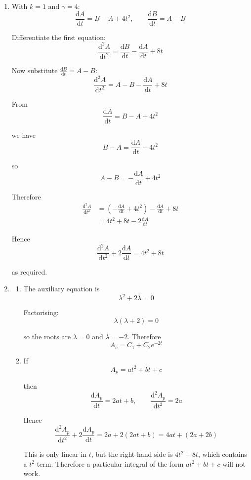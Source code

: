 \documentclass[leqno]{article}
\begin{document}
\begin{enumerate}[
  label=\textbf{\arabic*.},
  leftmargin=*,
  topsep=0pt,
  partopsep=0pt,
  parsep=0pt
]
\begin{djsSolution}
\begin{enumerate}[label=\textbf{(\alph*)}]
  \item With \(k=1\) and \(\gamma=4\):
  \[
  \frac{\mathrm{d}A}{\mathrm{d}t}=B-A+4t^2,
  \qquad
  \frac{\mathrm{d}B}{\mathrm{d}t}=A-B
  \]

  Differentiate the first equation:
  \[
  \frac{\mathrm{d}^2A}{\mathrm{d}t^2}=\frac{\mathrm{d}B}{\mathrm{d}t}-\frac{\mathrm{d}A}{\mathrm{d}t}+8t
  \]

  Now substitute \(\frac{\mathrm{d}B}{\mathrm{d}t}=A-B\):
  \[
  \frac{\mathrm{d}^2A}{\mathrm{d}t^2}=A-B-\frac{\mathrm{d}A}{\mathrm{d}t}+8t
  \]

  From
  \[
  \frac{\mathrm{d}A}{\mathrm{d}t}=B-A+4t^2
  \]

  we have
  \[
  B-A=\frac{\mathrm{d}A}{\mathrm{d}t}-4t^2
  \]

  so
  \[
  A-B=-\frac{\mathrm{d}A}{\mathrm{d}t}+4t^2
  \]

  Therefore
  \begin{align*}
  \frac{\mathrm{d}^2A}{\mathrm{d}t^2}
  &=\left(-\frac{\mathrm{d}A}{\mathrm{d}t}+4t^2\right)-\frac{\mathrm{d}A}{\mathrm{d}t}+8t \\
  &=4t^2+8t-2\frac{\mathrm{d}A}{\mathrm{d}t}
  \end{align*}

  Hence
  \[
  \frac{\mathrm{d}^2A}{\mathrm{d}t^2}+2\frac{\mathrm{d}A}{\mathrm{d}t}=4t^2+8t
  \]

  as required.

  \item
  \begin{enumerate}[label=(\roman*)]
    \item The auxiliary equation is
    \[
    \lambda^2+2\lambda=0
    \]

    Factorising:
    \[
    \lambda(\lambda+2)=0
    \]

    so the roots are \(\lambda=0\) and \(\lambda=-2\). Therefore
    \[
    A_c=C_1+C_2e^{-2t}
    \]

    \item If
    \[
    A_p=at^2+bt+c
    \]

    then
    \[
    \frac{\mathrm{d}A_p}{\mathrm{d}t}=2at+b,
    \qquad
    \frac{\mathrm{d}^2A_p}{\mathrm{d}t^2}=2a
    \]

    Hence
    \[
    \frac{\mathrm{d}^2A_p}{\mathrm{d}t^2}+2\frac{\mathrm{d}A_p}{\mathrm{d}t}
    =2a+2(2at+b)=4at+(2a+2b)
    \]

    This is only linear in \(t\), but the right-hand side is \(4t^2+8t\), which contains a \(t^2\) term. Therefore a particular integral of the form \(at^2+bt+c\) will not work.


\end{enumerate}
\end{enumerate}
\end{djsSolution}
\end{enumerate}
\end{document}
